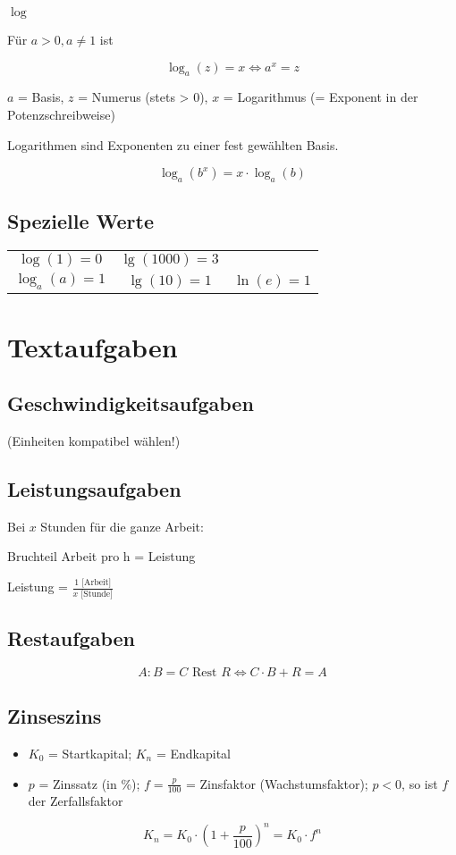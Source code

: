 \begin{multicols}{2}
\begin{definition}{$\log$}{}

Für $a>0, a\ne 1$ ist

$$\log_a{}(z)=x \Longleftrightarrow{} a^x = z$$
\end{definition}
$a$ = Basis, $z$ = Numerus (stets > 0), $x$ = Logarithmus (= Exponent in der Potenzschreibweise)

Logarithmen sind Exponenten zu einer fest gewählten Basis.

\begin{gesetz}{}{}
$$\log_a(b^x) = x\cdot{}\log_a(b)$$
\end{gesetz}

\subsection{Spezielle Werte}
\begin{tabular}{ccc}
$\log(1)=0$     &    $\lg(1000)=3$           &\\
$\log_a(a) = 1$ & $\lg(10) = 1$ & $\ln(e) = 1$\\
\end{tabular}


\hrulefill
\section{Textaufgaben}

\subsection{Geschwindigkeitsaufgaben}
 (Einheiten kompatibel wählen!)

\subsection{Leistungsaufgaben}
Bei $x$ Stunden für die ganze Arbeit:

Bruchteil Arbeit pro h = Leistung

Leistung = $\frac{1 \textrm{ [Arbeit]}}{x \textrm{ [Stunde]}}$

\subsection{Restaufgaben}
$$A:B = C \textrm{ Rest } R \Longleftrightarrow{}  C\cdot{}B+R = A$$

\subsection{Zinseszins}
\begin{itemize}
\item $K_0$ = Startkapital; $K_n$ = Endkapital
\item $p$ = Zinssatz (in \%); $f = \frac{p}{100}$ = Zinsfaktor
(Wachstumsfaktor); $p<0$, so ist $f$ der Zerfallsfaktor
\end{itemize}
$$K_n = K_0 \cdot{} \left( 1+\frac{p}{100} \right)^n = K_0\cdot{}f^n$$


\end{multicols}
